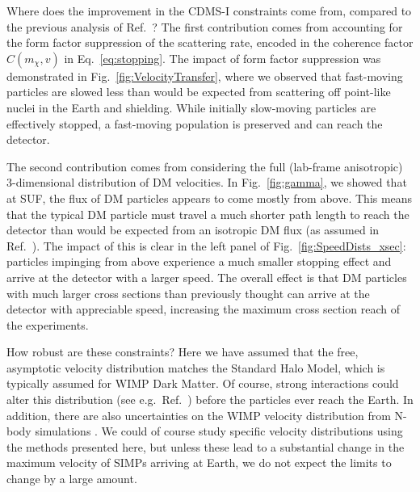 \documentclass[prd,twocolumn,showpacs,nofootinbib,aps]{revtex4-1}
\begin{document}
Where does the improvement in the CDMS-I constraints come from, compared to the previous analysis of Ref.~\cite{Albuquerque:2003ei}? The first contribution comes from accounting for the form factor suppression of the scattering rate, encoded in the coherence factor $C(m_\chi, v)$ in Eq.~\eqref{eq:stopping}. The impact of form factor suppression was demonstrated in Fig.~\ref{fig:VelocityTransfer}, where we observed that fast-moving particles are slowed less than would be expected from scattering off point-like nuclei in the Earth and shielding. While initially slow-moving particles are effectively stopped,  a fast-moving population is preserved and can reach the detector.

The second contribution comes from considering the full (lab-frame anisotropic) 3-dimensional distribution of DM velocities. In Fig.~\ref{fig:gamma}, we showed that at SUF, the flux of DM particles appears to come mostly from above. This means that the typical DM particle must travel a much shorter path length to reach the detector than would be expected from an isotropic DM flux (as assumed in Ref.~\cite{Albuquerque:2003ei}). The impact of this is clear in the left panel of Fig.~\ref{fig:SpeedDists_xsec}: particles impinging from above experience a much smaller stopping effect and arrive at the detector with a larger speed. The overall effect is that DM particles with much larger cross sections than previously thought can arrive at the detector with appreciable speed, increasing the maximum cross section reach of the experiments.

How robust are these constraints? Here we have assumed that the free, asymptotic velocity distribution matches the Standard Halo Model, which is typically assumed for WIMP Dark Matter. Of course, strong interactions could alter this distribution (see e.g.~Ref.~\cite{Fan:2013yva}) before the particles ever reach the Earth. In addition, there are also uncertainties on the WIMP velocity distribution from N-body simulations \cite{Bozorgnia:2017brl}. We could of course study specific velocity distributions using the methods presented here, but unless these lead to a substantial change in the maximum velocity of SIMPs arriving at Earth, we do not expect the limits to change by a large amount.
\end{document}
